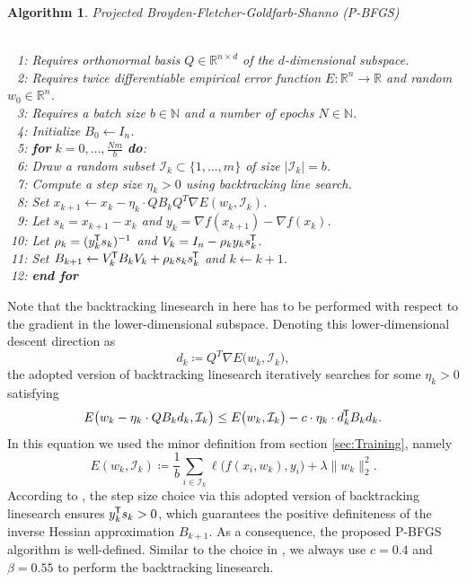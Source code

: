 \documentclass[11pt, a4paper]{article}
\newtheorem{algorithm}[theorem]{Algorithm}
\newcommand{\N}{\mathbb{N}}
\newcommand{\R}{\mathbb{R}}
\newcommand{\I}{\mathcal{I}}
\newcommand*{\tr}{^{\mkern-1.5mu\mathsf{T}}}
\begin{document}
\begin{algorithm}
\caption{Projected Broyden-Fletcher-Goldfarb-Shanno (P-BFGS) \textcolor{white}{$\Big |$}} \ \\
\textcolor{white}{$\Big |$1}1: Requires orthonormal basis $Q \in \R^{n \times d}$ of the $d$-dimensional subspace. \\
\textcolor{white}{$\Big |$1}2: Requires twice differentiable empirical error function $E: \R^n \to \R$ and random $w_0 \in \R^n$. \\
\textcolor{white}{$\Big |$1}3: Requires a batch size $b \in \N$ and a number of epochs $N \in \N$. \\
\textcolor{white}{$\Big |$1}4: Initialize $B_0 \leftarrow I_n$. \\
\textcolor{white}{$\Big |$1}5: \textbf{for} $k=0, \dots, \frac{Nm}{b}$ \textbf{do}: \\
\textcolor{white}{$\Big |$1}6: \quad Draw a random subset $\I_k \subset \{1, \dots, m \}$ of size $| \I_k | = b$. \\
\textcolor{white}{$\Big |$1}7: \quad Compute a step size $\eta_k > 0$ using backtracking line search. \\
\textcolor{white}{$\Big |$1}8: \quad Set $x_{k+1} \leftarrow x_k - \eta_k \cdot Q B_k Q^T \nabla E(w_k,\I_k)$. \\
\textcolor{white}{$\Big |$1}9: \quad Let $s_k = x_{k+1} - x_{k}$ and $y_k = \nabla f(x_{k+1}) - \nabla f(x_{k})$. \\
\textcolor{white}{$\Big |$}10: \quad Let $\rho_k = (y_k\tr s_k)^{-1}$ and $V_k = I_n - \rho_k y_k s_k\tr $. \\
\textcolor{white}{$\Big |$}11: \quad Set $B_{k+1} \leftarrow V_k\tr B_{k}V_k + \rho_k s_k s_k\tr $ and $k \leftarrow k+1$. \\
\textcolor{white}{$\Big |$}12: \textbf{end for}
\end{algorithm}

Note that the backtracking linesearch in here has to be performed with respect to the gradient in the lower-dimensional subspace. Denoting this lower-dimensional descent direction as
\[ d_k \coloneq Q^T \nabla E \big (w_k,\I_k \big), \] 
the adopted version of backtracking linesearch iteratively searches for some $\eta_k > 0$ satisfying 
\[ E \big (w_k - \eta_k \cdot Q B_k d_k, \I_k \big) \leq E \big (w_k, \I_k \big ) - c \cdot \eta_k \cdot d_k \tr B_k d_k. \]
In this equation we used the minor definition from section \ref{sec:Training}, namely 
\[ E(w_k,\I_k) \coloneq \frac{1}{b} \sum_{i \in \I_k}^{}  \ell \big ( f(x_i,w_k),y_i \big) + \lambda \big \| w_k \big \|_2^2. \]
According to \cite{Paper}, the step size choice via this adopted version of backtracking linesearch ensures $y_k \tr s_k > 0$, which guarantees the positive definiteness of the inverse Hessian approximation $B_{k+1}$. As a consequence, the proposed P-BFGS algorithm is well-defined. Similar to the choice in \cite{Paper}, we always use $c = 0.4$ and $\beta = 0.55$ to perform the  backtracking linesearch.
\end{document}
